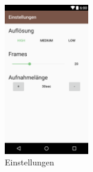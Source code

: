 \begin{figure}
	\centering
	\includegraphics[width=0.33\textwidth]{subtopicsFuncspec/Res/Mockups/Settings1.png}
 	 \caption{Einstellungen}
\end{figure}

